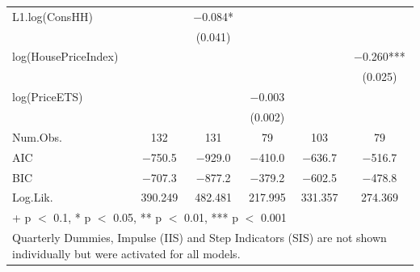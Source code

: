 \begin{table}
{\begin{tabular}[t]{lccccc}
L1.log(ConsHH) &  & \num{-0.084}* &  &  & \\
 &  & (\num{0.041}) &  &  & \\
log(HousePriceIndex) &  &  &  &  & \num{-0.260}***\\
 &  &  &  &  & (\num{0.025})\\
log(PriceETS) &  &  & \num{-0.003} &  & \\
 &  &  & (\num{0.002}) &  & \\
\midrule
Num.Obs. & \num{132} & \num{131} & \num{79} & \num{103} & \num{79}\\
AIC & \num{-750.5} & \num{-929.0} & \num{-410.0} & \num{-636.7} & \num{-516.7}\\
BIC & \num{-707.3} & \num{-877.2} & \num{-379.2} & \num{-602.5} & \num{-478.8}\\
Log.Lik. & \num{390.249} & \num{482.481} & \num{217.995} & \num{331.357} & \num{274.369}\\
\bottomrule
\multicolumn{6}{l}{\rule{0pt}{1em}+ p $<$ 0.1, * p $<$ 0.05, ** p $<$ 0.01, *** p $<$ 0.001}\\
\multicolumn{6}{l}{\rule{0pt}{1em}Quarterly Dummies, Impulse (IIS) and Step Indicators (SIS) are not shown individually but were activated for all models.}\\
\end{tabular}}
\end{table}

